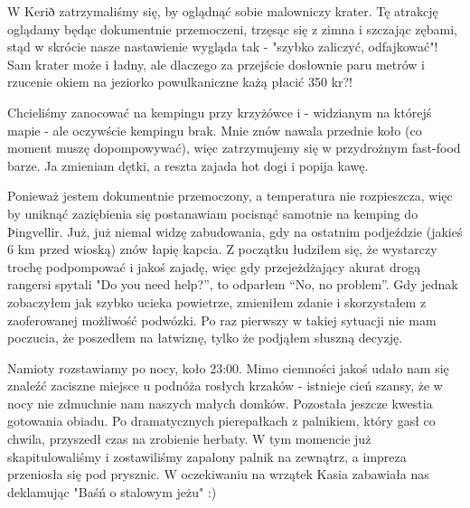 
W Kerið zatrzymaliśmy się, by oglądnąć sobie malowniczy krater. Tę atrakcję oglądamy będąc dokumentnie przemoczeni, trzęsąc się z zimna i szczając zębami, stąd w skrócie nasze nastawienie wygląda tak - "szybko zaliczyć, odfajkować"! Sam krater może i ładny, ale dlaczego za przejście dosłownie paru metrów i rzucenie okiem na jeziorko powulkaniczne każą płacić 350 kr?!

Chcieliśmy zanocować na kempingu przy krzyżówce  i  - widzianym na którejś mapie - ale oczywście kempingu brak. Mnie znów nawala przednie koło (co moment muszę dopompowywać), więc zatrzymujemy się w przydrożnym fast-food barze. Ja zmieniam dętki, a reszta zajada hot dogi i popija kawę.


Ponieważ jestem dokumentnie przemoczony, a temperatura nie rozpieszcza, więc by uniknąć zaziębienia się postanawiam pocisnąć samotnie na kemping do Þingvellir. Już, już niemal widzę zabudowania, gdy na ostatnim podjeździe (jakieś 6 km przed wioską) znów łapię kapcia. Z początku łudziłem się, że wystarczy trochę podpompować i jakoś zajadę, więc gdy przejeżdżający akurat drogą rangersi spytali "Do you need help?”, to odparłem “No, no problem”. Gdy jednak zobaczyłem jak szybko ucieka powietrze, zmieniłem zdanie i skorzystałem z zaoferowanej możliwość podwózki. Po raz pierwszy w takiej sytuacji nie mam poczucia, że poszedłem na łatwiznę, tylko że podjąłem słuszną decyzję.

Namioty rozstawiamy po nocy, koło 23:00. Mimo ciemności jakoś udało nam się znaleźć zaciszne miejsce u podnóża rosłych krzaków - istnieje cień szansy, że w nocy nie zdmuchnie nam naszych małych domków. Pozostała jeszcze kwestia gotowania obiadu. Po dramatycznych pierepałkach z palnikiem, który gasł co chwila, przyszedł czas na zrobienie herbaty. W tym momencie już skapitulowaliśmy i zostawiliśmy zapalony palnik na zewnątrz, a impreza przeniosła się pod prysznic. W oczekiwaniu na wrzątek Kasia zabawiała nas deklamując "Baśń o stalowym jeżu" :)

